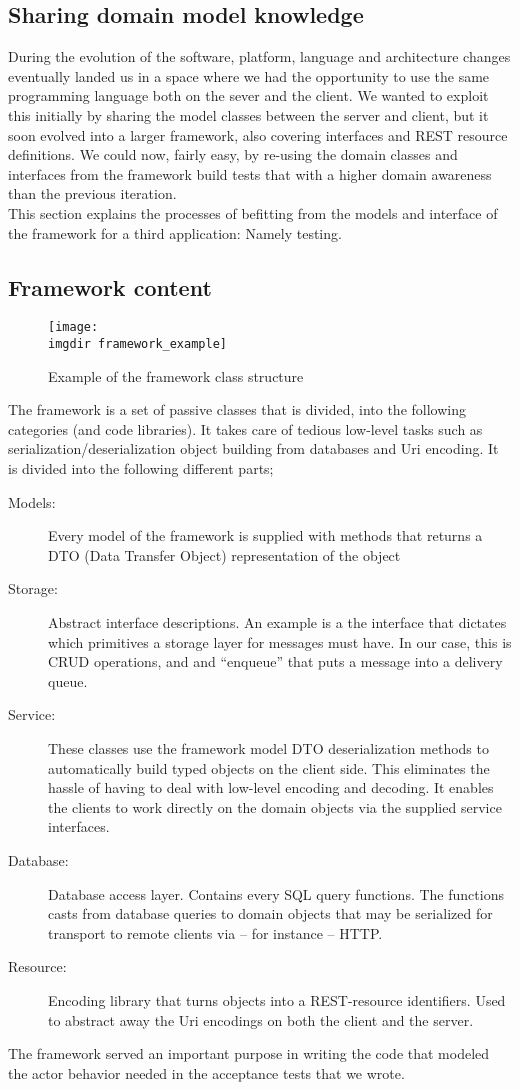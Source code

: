 \subsection{Sharing domain model knowledge}
During the evolution of the software, platform, language and architecture changes eventually landed us in a space where we had the opportunity to use the same programming language both on the sever and the client. We wanted to exploit this initially by sharing the model classes between the server and client, but it soon evolved into a larger framework, also covering interfaces and REST resource definitions. We could now, fairly easy, by re-using the domain classes and interfaces from the framework build tests that with a higher domain awareness than the previous iteration.\\
This section explains the processes of befitting from the models and interface of the framework for a third application: Namely testing. 

\subsection{Framework content}
\label{ssec:openreception_framework}
\begin{figure}[!htbp]
\texttt{[image: \\imgdir framework\_example]}
\centering
\caption{Example of the framework class structure}
\label{fig:framework_example}
\end{figure}
\noindent
The framework is a set of passive classes that is divided, into the following categories (and code libraries). It takes care of tedious low-level tasks such as serialization/deserialization object building from databases and Uri encoding. It is divided into the following different parts;
\begin{description}
  \item[Models:] Every model of the framework is supplied with methods that returns a DTO (Data Transfer Object) representation of the object
  \item[Storage:] Abstract interface descriptions. An example is a the interface that dictates which primitives a storage layer for messages must have. In our case, this is CRUD operations, and and ``enqueue'' that puts a message into a delivery queue.
  \item[Service:] These classes use the framework model DTO deserialization methods to automatically build typed objects on the client side. This eliminates the hassle of having to deal with low-level encoding and decoding. It enables the clients to work directly on the domain objects via the supplied service interfaces.
  \item[Database:] Database access layer. Contains every SQL query functions. The functions casts from database queries to domain objects that may be serialized for transport to remote clients via -- for instance -- HTTP.
  \item[Resource:] Encoding library that turns objects into a REST-resource identifiers. Used to abstract away the Uri encodings on both the client and the server.
\end{description}
The framework served an important purpose in writing the code that modeled the actor behavior needed in the acceptance tests that we wrote.
